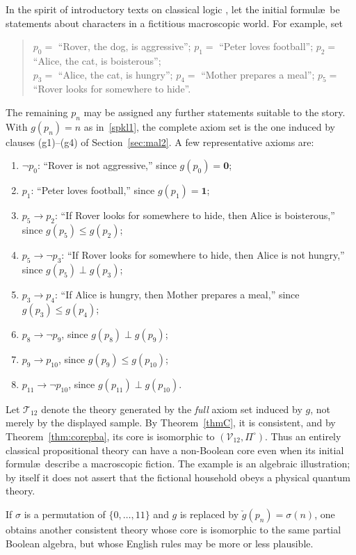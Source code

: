 \documentclass{article}   	%
\theoremstyle{plain}
\theoremstyle{definition}
\theoremstyle{remark}
\begin{document}
In the spirit of introductory texts on classical logic \cite{Copi1979}, let the
initial formul\ae\ be statements about characters in a fictitious macroscopic
world.  For example, set
\begin{quote}
$p_0=$ ``Rover, the dog, is aggressive''; \quad
$p_1=$ ``Peter loves football''; \quad
$p_2=$ ``Alice, the cat, is boisterous'';\\
$p_3=$ ``Alice, the cat, is hungry''; \quad
$p_4=$ ``Mother prepares a meal''; \quad
$p_5=$ ``Rover looks for somewhere to hide''.
\end{quote}
The remaining $p_n$ may be assigned any further statements suitable to the
story.  With $g(p_n)=n$ as in~\eqref{spkl1}, the complete axiom set is the one
induced by clauses (g1)--(g4) of Section~\ref{sec:mal2}.  A few representative
axioms are:
\begin{enumerate}
\item[(A1)] $\neg p_0$: ``Rover is not aggressive,'' since
$g(p_0)=\mathbf 0$;
\item[(A2)] $p_1$: ``Peter loves football,'' since
$g(p_1)=\mathbf 1$;
\item[(A3)] $p_5\to p_2$: ``If Rover looks for somewhere to hide, then Alice is
boisterous,'' since $g(p_5)\le g(p_2)$;
\item[(A4)] $p_5\to\neg p_3$: ``If Rover looks for somewhere to hide, then Alice
is not hungry,'' since $g(p_5)\perp g(p_3)$;
\item[(A5)] $p_3\to p_4$: ``If Alice is hungry, then Mother prepares a meal,''
since $g(p_3)\le g(p_4)$;
\item[(A6)] $p_8\to\neg p_9$, since $g(p_8)\perp g(p_9)$;
\item[(A7)] $p_9\to p_{10}$, since $g(p_9)\le g(p_{10})$;
\item[(A8)] $p_{11}\to\neg p_{10}$, since
$g(p_{11})\perp g(p_{10})$.
\end{enumerate}
Let $\mathcal T_{12}$ denote the theory generated by the \emph{full} axiom set
induced by $g$, not merely by the displayed sample.  By
Theorem~\ref{thmC}, it is consistent, and by
Theorem~\ref{thm:corepba}, its core is isomorphic to
$(\mathcal V_{12},\Pi^\circ)$.  Thus an entirely classical propositional theory
can have a non-Boolean core even when its initial formul\ae\ describe a
macroscopic fiction.  The example is an algebraic illustration; by itself it
does not assert that the fictional household obeys a physical quantum theory.

If $\sigma$ is a permutation of $\{0,\dots,11\}$ and $g$ is replaced by
$\check g(p_n)=\sigma(n)$, one obtains another consistent theory whose core is
isomorphic to the same partial Boolean algebra, but whose English rules may be
more or less plausible.
\end{document}

